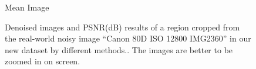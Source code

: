 \begin{figure}[t!]
{\begin{minipage}[t]{0.19\textwidth}
{\footnotesize Mean Image}
\end{minipage}
}  \vspace{-3mm}
    \caption{Denoised images and PSNR(dB) results of a region cropped from the real-world noisy image ``Canon 80D ISO 12800 IMG2360'' in our new dataset by different methods.. The images are better to be zoomed in on screen.}
    \label{fig3-19}
\end{figure}

\begin{figure}[t!]
\vspace{-3mm}
    \centering
{}
\end{figure}
